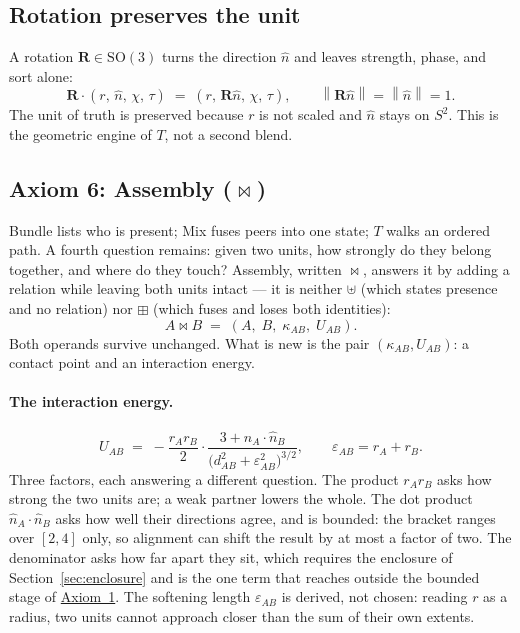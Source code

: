 \documentclass[12pt, a4paper]{article}
\providecommand{\norm}[1]{\left\lVert#1\right\rVert}
\begin{document}
\subsection{Rotation preserves the unit}
\label{subsec:axiom_rotation}
A rotation $\mathbf{R} \in \mathrm{SO}(3)$ turns the direction $\hat n$ and leaves strength, phase, and sort alone:
\begin{equation}
    \mathbf{R}\cdot(r,\,\hat n,\,\chi,\,\tau)
    \;=\;
    (r,\,\mathbf{R}\hat n,\,\chi,\,\tau),
    \qquad
    \norm{\mathbf{R}\hat n} = \norm{\hat n} = 1.
\end{equation}
The unit of truth is preserved because $r$ is not scaled and $\hat n$ stays on $S^2$. This is the geometric engine of $T$, not a second blend.

\subsection{Axiom 6: Assembly (\texorpdfstring{$\bowtie$}{assembly})}
\label{subsec:axiom_assembly}
Bundle lists who is present; Mix fuses peers into one state; $T$
walks an ordered path. A fourth question remains: given two units,
how strongly do they belong together, and where do they touch?
Assembly, written $\bowtie$, answers it by adding a relation while
leaving both units intact --- it is neither $\uplus$ (which states
presence and no relation) nor $\boxplus$ (which fuses and loses both
identities):
\begin{equation}
    A \bowtie B \;=\; (A,\;B,\;\kappa_{AB},\;U_{AB}).
    \label{eq:assembly_signature}
\end{equation}
Both operands survive unchanged. What is new is the pair
$(\kappa_{AB}, U_{AB})$: a contact point and an interaction energy.

\paragraph{The interaction energy.}
\begin{equation}
    U_{AB} \;=\; -\frac{r_A r_B}{2}\cdot
    \frac{3+\hat n_A\cdot\hat n_B}
         {\bigl(d_{AB}^2+\varepsilon_{AB}^2\bigr)^{3/2}},
    \qquad
    \varepsilon_{AB} = r_A + r_B.
    \label{eq:assembly_energy}
\end{equation}
Three factors, each answering a different question. The product
$r_Ar_B$ asks how strong the two units are; a weak partner lowers the
whole. The dot product $\hat n_A\cdot\hat n_B$ asks how well their
directions agree, and is bounded: the bracket ranges over $[2,4]$
only, so alignment can shift the result by at most a factor of two.
The denominator asks how far apart they sit, which requires the
enclosure of Section~\ref{sec:enclosure} and is the one term that
reaches outside the bounded stage of \hyperref[subsec:axiom1]{Axiom~1}. The
softening length $\varepsilon_{AB}$ is derived, not chosen: reading
$r$ as a radius, two units cannot approach closer than the sum of
their own extents.
\end{document}
